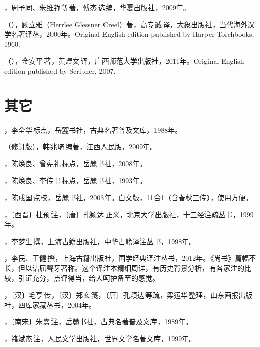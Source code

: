 ，周予同、朱维铮\,等著，傅杰\,选编，华夏出版社，2009年。

（），顾立雅（Herrlee Glessner Creel）著，高专诚\,译，大象出版社，当代海外汉学名著译丛，2000年。Original English edition published by Harper Torchbooks, 1960.

（），金安平\,著，黄煜文\,译，广西师范大学出版社，2011年。Original English edition published by Scribner, 2007.




\lypdfbookmark\section*{其它}

，李全华\,标点，岳麓书社，古典名著普及文库，1988年。

（修订版），韩兆琦\,编著，江西人民版，2009年。

，陈焕良、曾宪礼\,标点，岳麓书社，2008年。

，陈焕良、李传书\,标点，岳麓书社，1993年。

，陈戍国\,点校，岳麓书社，2003年。白文版，11合1（含春秋三传），使用方便。

，〔西晋〕杜预\,注，〔唐〕孔颖达\,正义，北京大学出版社，十三经注疏丛书，1999年。

，李梦生\,撰，上海古籍出版社，中华古籍译注丛书，1998年。

，李民、王健\,撰，上海古籍出版社，国学经典译注丛书，2012年。《尚书》篇幅不长，但以诘屈聱牙著称。这个译注本精细周详，有历史背景分析，有各家注的比较，引证充分，点评得当，给人呵护备至的感觉。

，〔汉〕毛亨\,传，〔汉〕郑玄\,笺，〔唐〕孔颖达\,等疏，梁运华\,整理，山东画报出版社，四库家藏丛书，2004年。

，〔南宋〕朱熹\,注，岳麓书社，古典名著普及文库，1989年。

，褚斌杰\,注，人民文学出版社，世界文学名著文库，1999年。

